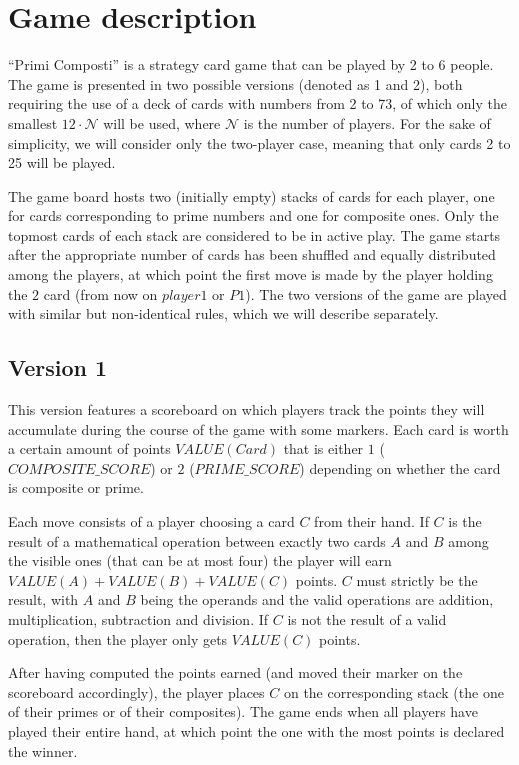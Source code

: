 \documentclass[conference]{IEEEtran}
\begin{document}
\section{Game description}
``Primi Composti''\cite{murrone_copyright} is a strategy card game that can be played by 2 to 6 people.
The game is presented in two possible versions (denoted as 1 and 2), both requiring the use of a deck of cards with numbers from 2 to 73, of which only the smallest $12\cdot \mathcal{N}$ will be used, where $\mathcal{N}$ is the number of players. For the sake of simplicity, we will consider only the two-player case, meaning that only cards 2 to 25 will be played. 

The game board hosts two (initially empty) stacks of cards for each player, one for cards corresponding to prime numbers and one for composite ones. Only the topmost cards of each stack are considered to be in active play.
The game starts after the appropriate number of cards has been shuffled and equally distributed among the players, at which point the first move is made by the player holding the $2$ card (from now on $player 1$ or $P1$).
The two versions of the game are played with similar but non-identical rules, which we will describe separately.

\subsection{Version 1}
This version features a scoreboard on which players track the points they will accumulate during the course of the game with some markers.
Each card is worth a certain amount of points $VALUE(Card)$ that is either $1$ ($COMPOSITE\_SCORE$) or $2$ ($PRIME\_SCORE$) depending on whether the card is composite or prime. 

Each move consists of a player choosing a card $C$ from their hand. If $C$ is the result of a mathematical operation between exactly two cards  $A$ and $B$ among the visible ones (that can be at most four) the player will earn $VALUE(A) + VALUE(B) + VALUE(C)$ points. $C$ must strictly be the result, with $A$ and $B$ being the operands and the valid operations are addition, multiplication, subtraction and division.
If $C$ is not the result of a valid operation, then the player only gets $VALUE(C)$ points. 

After having computed the points earned (and moved their marker on the scoreboard accordingly), the player places $C$ on the corresponding stack (the one of their primes or of their composites).
The game ends when all players have played their entire hand, at which point the one with the most points is declared the winner.
\end{document}
